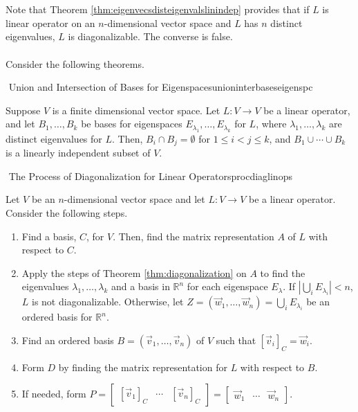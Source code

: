         \vphantom
        \\
        \\
        Note that Theorem \ref{thm:eigenvecsdisteigenvalslinindep} provides that if \(L\) is linear operator on an \(n\)-dimensional vector space and \(L\) has \(n\) distinct eigenvalues, \(L\) is diagonalizable. The converse is false.
        \pagebreak
        \\
        \\
        Consider the following theorems.
        \begin{theorem}{\Stop\,\,Union and Intersection of Bases for Eigenspaces}{unioninterbaseseigenspc}

            Suppose \(V\) is a finite dimensional vector space. Let \(L:V\to V\) be a linear operator, and let \(B_1,\ldots,B_k\) be bases for eigenspaces \(E_{\lambda_1},\ldots,E_{\lambda_k}\) for \(L\), where \(\lambda_1,\ldots,\lambda_k\) are distinct eigenvalues for \(L\). Then, \(B_i\cap B_j=\emptyset\) for \(1\leq i<j\leq k\), and \(B_1\cup \cdots\cup B_k\) is a linearly independent subset of \(V\).
            
        \end{theorem}
        \begin{theorem}{\Stop\,\,The Process of Diagonalization for Linear Operators}{procdiaglinops}

            Let \(V\) be an \(n\)-dimensional vector space and let \(L:V\to V\) be a linear operator. Consider the following steps.
            \begin{enumerate}
                \item Find a basis, \(C\), for \(V\). Then, find the matrix representation \(A\) of \(L\) with respect to \(C\).
                \item Apply the steps of Theorem \ref{thm:diagonalization} on \(A\) to find the eigenvalues \(\lambda_1,\ldots,\lambda_k\) and a basis in \(\mathbb{R}^n\) for each eigenspace \(E_\lambda\). If \(\left|\bigcup_{i}E_{\lambda_i}\right|<n\), \(L\) is not diagonalizable. Otherwise, let \(Z=(\vec{w}_1,\ldots,\vec{w}_n)=\bigcup_i E_{\lambda_i}\) be an ordered basis for \(\mathbb{R}^n\).
                \item Find an ordered basis \(B=(\vec{v}_1,\ldots,\vec{v}_n)\) of \(V\) such that \([\vec{v}_i]_C=\vec{w}_i\).
                \item Form \(D\) by finding the matrix representation for \(L\) with respect to \(B\).
                \item If needed, form \(P=\begin{bmatrix} [\vec{v}_1]_C & \cdots & [\vec{v}_n]_C \end{bmatrix}=\begin{bmatrix} \vec{w}_1 & \cdots & \vec{w}_n \end{bmatrix}\).
            \end{enumerate}

        \end{theorem}